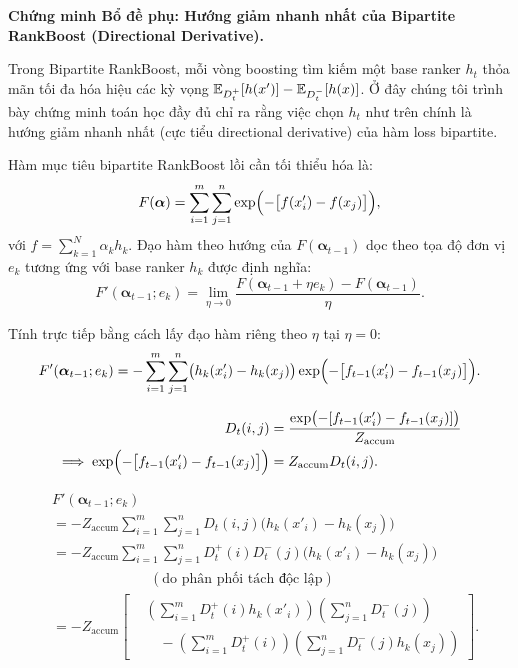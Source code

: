 \begin{morong}
\textbf{Chứng minh Bổ đề phụ: Hướng giảm nhanh nhất của Bipartite RankBoost (Directional Derivative).}

Trong Bipartite RankBoost, mỗi vòng boosting tìm kiếm một base ranker $h_t$ thỏa mãn tối đa hóa hiệu các kỳ vọng $\mathbb{E}_{D^+_t}[h(x')] - \mathbb{E}_{D^-_t}[h(x)]$. Ở đây chúng tôi trình bày chứng minh toán học đầy đủ chỉ ra rằng việc chọn $h_t$ như trên chính là hướng giảm nhanh nhất (cực tiểu directional derivative) của hàm loss bipartite.

Hàm mục tiêu bipartite RankBoost lồi cần tối thiểu hóa là:
\[
    F(\bm{\alpha}) = \sum_{i=1}^m \sum_{j=1}^n \exp\Bigl(-\bigl[f(x'_i) - f(x_j)\bigr]\Bigr),
\]
với $f = \sum_{k=1}^N \alpha_k h_k$. Đạo hàm theo hướng của $F(\bm{\alpha}_{t-1})$ dọc theo tọa độ đơn vị $e_k$ tương ứng với base ranker $h_k$ được định nghĩa:
\[
    F'(\bm{\alpha}_{t-1}; e_k) = \lim_{\eta \to 0} \frac{F(\bm{\alpha}_{t-1} + \eta e_k) - F(\bm{\alpha}_{t-1})}{\eta}.
\]

Tính trực tiếp bằng cách lấy đạo hàm riêng theo $\eta$ tại $\eta = 0$:
\[
    F'(\bm{\alpha}_{t-1}; e_k) = -\sum_{i=1}^m \sum_{j=1}^n \bigl(h_k(x'_i) - h_k(x_j)\bigr) \exp\Bigl(-\bigl[f_{t-1}(x'_i) - f_{t-1}(x_j)\bigr]\Bigr).
\]

\begin{align}
    D_t(i, j) &= \frac{\exp\bigl(-[f_{t-1}(x'_i) - f_{t-1}(x_j)]\bigr)}{Z_{\text{accum}}} \nonumber \\
    \implies \exp\Bigl(-\bigl[f_{t-1}(x'_i) - f_{t-1}(x_j)\bigr]\Bigr) &= Z_{\text{accum}} D_t(i, j).
    \label{eq:bipartite_d_accum}
\end{align}

\begin{align*}
    &F'(\bm{\alpha}_{t-1}; e_k) \\
    &= -Z_{\text{accum}} \sum_{i=1}^m \sum_{j=1}^n D_t(i, j) \bigl(h_k(x'_i) - h_k(x_j)\bigr) \\
    &= -Z_{\text{accum}} \sum_{i=1}^m \sum_{j=1}^n
       D^+_t(i)D^-_t(j)\bigl(h_k(x'_i) - h_k(x_j)\bigr) \\
    &\hspace{7em}(\text{do phân phối tách độc lập}) \\
    &= -Z_{\text{accum}}
    \left[
    \begin{aligned}
    &\left(\sum_{i=1}^m D^+_t(i) h_k(x'_i)\right)
      \left(\sum_{j=1}^n D^-_t(j)\right) \\
    &\quad -
      \left(\sum_{i=1}^m D^+_t(i)\right)
      \left(\sum_{j=1}^n D^-_t(j) h_k(x_j)\right)
    \end{aligned}
    \right].
\end{align*}


\end{morong}
